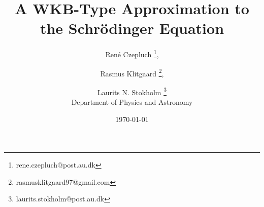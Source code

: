 \documentclass[danish, a4paper, twocolumn, oneside]{memoir}
\title{A WKB-Type Approximation to the Schrödinger Equation}
\author{%
        René Czepluch       \thanks{rene.czepluch@post.au.dk},
   \and Rasmus Klitgaard    \thanks{rasmusklitgaard97@gmail.com},
   \and Laurits N. Stokholm \thanks{laurits.stokholm@post.au.dk}\\
   \hspace{-9cm} Department of Physics and Astronomy
   }
\date{\today}
\begin{document}
\maketitle
\noindent

%
%
%
%
%
%
\end{document}
